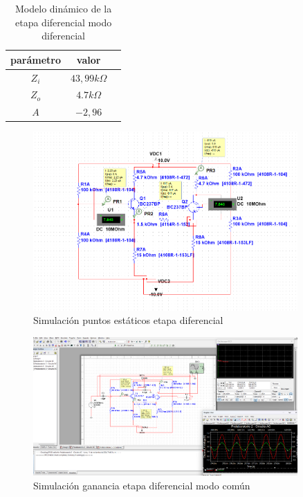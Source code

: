 \begin{table}[ht]
    \centering
    \begin{tabular}{|c|c|c|}
        \hline
        parámetro & valor  \\
        \hline
        $Z_i$ & $43,99k\Omega$ \\
        \hline
        $Z_o$ & $4.7k\Omega$ \\
        \hline
        $A$ & $-2,96$ \\
        \hline
    \end{tabular}
    \caption{Modelo dinámico de la etapa diferencial modo diferencial}
    \label{tab:met-etapa-diferencial-modelo-dinamico-modo-diferencial}
\end{table}

\begin{figure}[ht]
    \centering
    \includegraphics[width=0.9\textwidth]{src/images/p2/punto-estatico-p2.png}
    \caption{Simulación puntos estáticos etapa diferencial}
    \label{fig:sim-etapa-diferencial-puntos-estaticos}
\end{figure}

\begin{figure}[ht]
    \centering
    \includegraphics[width=0.9\textwidth]{src/images/p2/ganancia-etapa-diff-modo-comun.png}
    \caption{Simulación ganancia etapa diferencial modo común}
    \label{fig:sim-etapa-diferencial-ganancia-modo-comun}
\end{figure}

